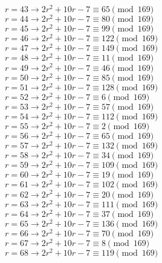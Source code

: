 \documentclass[12pt]{article}
\begin{document}
\begin{itemize}
\begin{multicols}{2}
$r = 43 \rightarrow 2r^2 + 10r - 7 \equiv 65 \pmod{169}$ \\
$r = 44 \rightarrow 2r^2 + 10r - 7 \equiv 80 \pmod{169}$ \\
$r = 45 \rightarrow 2r^2 + 10r - 7 \equiv 99 \pmod{169}$ \\
$r = 46 \rightarrow 2r^2 + 10r - 7 \equiv 122 \pmod{169}$ \\
$r = 47 \rightarrow 2r^2 + 10r - 7 \equiv 149 \pmod{169}$ \\
$r = 48 \rightarrow 2r^2 + 10r - 7 \equiv 11 \pmod{169}$ \\
$r = 49 \rightarrow 2r^2 + 10r - 7 \equiv 46 \pmod{169}$ \\
$r = 50 \rightarrow 2r^2 + 10r - 7 \equiv 85 \pmod{169}$ \\
$r = 51 \rightarrow 2r^2 + 10r - 7 \equiv 128 \pmod{169}$ \\
$r = 52 \rightarrow 2r^2 + 10r - 7 \equiv 6 \pmod{169}$ \\
$r = 53 \rightarrow 2r^2 + 10r - 7 \equiv 57 \pmod{169}$ \\
$r = 54 \rightarrow 2r^2 + 10r - 7 \equiv 112 \pmod{169}$ \\
$r = 55 \rightarrow 2r^2 + 10r - 7 \equiv 2 \pmod{169}$ \\
$r = 56 \rightarrow 2r^2 + 10r - 7 \equiv 65 \pmod{169}$ \\
$r = 57 \rightarrow 2r^2 + 10r - 7 \equiv 132 \pmod{169}$ \\
$r = 58 \rightarrow 2r^2 + 10r - 7 \equiv 34 \pmod{169}$ \\
$r = 59 \rightarrow 2r^2 + 10r - 7 \equiv 109 \pmod{169}$ \\
$r = 60 \rightarrow 2r^2 + 10r - 7 \equiv 19 \pmod{169}$ \\
$r = 61 \rightarrow 2r^2 + 10r - 7 \equiv 102 \pmod{169}$ \\
$r = 62 \rightarrow 2r^2 + 10r - 7 \equiv 20 \pmod{169}$ \\
$r = 63 \rightarrow 2r^2 + 10r - 7 \equiv 111 \pmod{169}$ \\
$r = 64 \rightarrow 2r^2 + 10r - 7 \equiv 37 \pmod{169}$ \\
$r = 65 \rightarrow 2r^2 + 10r - 7 \equiv 136 \pmod{169}$ \\
$r = 66 \rightarrow 2r^2 + 10r - 7 \equiv 70 \pmod{169}$ \\
$r = 67 \rightarrow 2r^2 + 10r - 7 \equiv 8 \pmod{169}$ \\
$r = 68 \rightarrow 2r^2 + 10r - 7 \equiv 119 \pmod{169}$ \\

\end{multicols}
\end{itemize}
\end{document}
